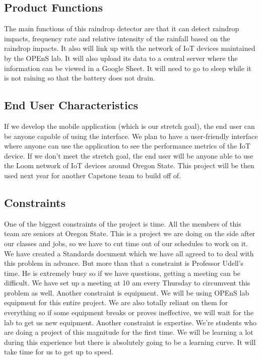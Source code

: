 \documentclass[letterpaper,10pt,draftclsnofoot,onecolumn]{article}
\begin{document}
\subsection{Product Functions}
The main functions of this raindrop detector are that it can detect raindrop impacts, frequency rate and relative intensity of the rainfall based on the raindrop impacts. It also will link up with the network of IoT devices maintained by the OPEnS lab. It will also upload its data to a central server where the information can be viewed in a Google Sheet. It will need to go to sleep while it is not raining so that the battery does not drain.

\subsection{End User Characteristics}
If we develop the mobile application (which is our stretch goal), the end user can be anyone capable of using the interface. We plan to have a user-friendly interface where anyone can use the application to see the performance metrics of the IoT device.
\newline
If we don't meet the stretch goal, the end user will be anyone able to use the Loom network of IoT devices around Oregon State. This project will be then used next year for another Capstone team to build off of.

\subsection{Constraints}
One of the biggest constraints of the project is time. All the members of this team are seniors at Oregon State. This is a project we are doing on the side after our classes and jobs, so we have to cut time out of our schedules to work on it. We have created a Standards document which we have all agreed to to deal with this problem in advance.
\newline
But more than that a constraint is Professor Udell's time. He is extremely busy so if we have questions, getting a meeting can be difficult. We have set up a meeting at 10 am every Thursday to circumvent this problem as well.
\newline
Another constraint is equipment. We will be using OPEnS lab equipment for this entire project. We are also totally reliant on them for everything so if some equipment breaks or proves ineffective, we will wait for the lab to get us new equipment.
\newline
Another constraint is expertise. We're students who are doing a project of this magnitude for the first time. We will be learning a lot during this experience but there is absolutely going to be a learning curve. It will take time for us to get up to speed.
\end{document}

